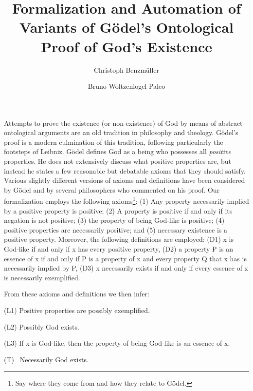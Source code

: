 \documentclass{llncs}
\title{
  Formalization and Automation of Variants of G\"{o}del's Ontological Proof of 
  God's Existence
}
\author{
  Christoph Benzm\"{u}ller\inst{1} 
  \and 
  Bruno Woltzenlogel Paleo\inst{2}
}
\institute{
  Dahlem Center for Intelligent Systems, Freie Universit\"{a}t Berlin, Germany\\
  \email{c.benzmueller@gmail.com}
  \and 
  Theory and Logic Group, Vienna University of Technology, Austria \\
  \email{bruno@logic.at}
}
\begin{document}
\maketitle

Attempts to prove the existence (or non-existence) of God by means of
abstract ontological arguments are an old tradition in philosophy and
theology.  G\"{o}del's proof \cite{Goedel} is a modern culmination of
this tradition, following particularly the footsteps of Leibniz.
%
G\"{o}del defines God as a being who possesses all \emph{positive} properties.
He does not extensively discuss what positive properties are, 
but instead he states a few reasonable but debatable axioms that they should satisfy.
Various slightly different versions of axioms and definitions have been considered by G\"{o}del and by several philosophers who commented on his proof. Our formalization employs the following axioms\footnote{Say where they come from and how they relate to G\"odel.}: (1) Any property necessarily implied by a positive property is positive;
(2) A property is positive if and only if its negation is not positive; (3) the property of being God-like is positive; (4) positive properties are necessarily positive; and (5) necessary existence is a positive property.
Moreover, the following definitions are employed:
(D1) x is God-like if and only if x has every positive property, (D2) a property P is an essence of x if and only if P is a property of x and every property Q that x has is necessarily implied by P, (D3) x necessarily exists if and only if every essence of x is necessarily exemplified.

From these axioms and definitions we then infer:


\begin{description}
\item {(L1)} Positive properties are possibly exemplified.
\item {(L2)} Possibly God exists.
\item {(L3)} If x is God-like, then the property of being 
God-like is an essence of x.
\item {(T)} \ Necessarily God exists.
\end{description}

\end{document}

